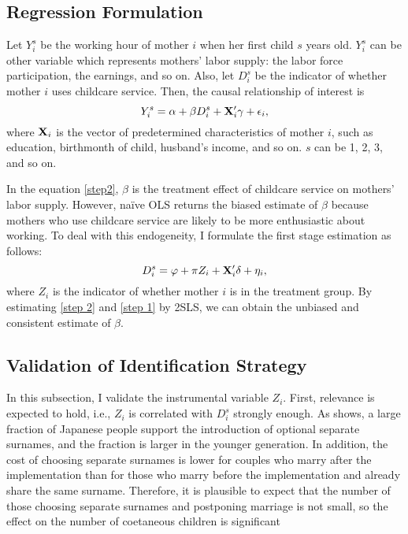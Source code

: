 \documentclass[12pt]{article}
\begin{document}
\subsection*{Regression Formulation}
Let $Y_i^s$ be the working hour of mother $i$ when her first child $s$ years old.
$Y_i^s$ can be other variable which represents mothers' labor supply: the labor force participation, the earnings, and so on.
Also, let $D_i^s$ be the indicator of whether mother $i$ uses childcare service. 
Then, the causal relationship of interest is 
\begin{equation}
  Y_i^s = \alpha + \beta D_i^s + \vb{X}_i'\vb{\gamma} + \epsilon_i, \label{step2}
\end{equation}
where $\vb{X}_i$ is the vector of predetermined characteristics of mother $i$, such as education, birthmonth of child, husband's income, and so on.
$s$ can be 1, 2, 3, and so on.


In the equation \eqref{step2}, $\beta$ is the treatment effect of childcare service on mothers' labor supply.
However, na\"ive OLS returns the biased estimate of $\beta$ because mothers who use childcare service are likely to be more enthusiastic about working.
To deal with this endogeneity, I formulate the first stage estimation as follows:
\begin{equation}
  D_i^s = \varphi + \pi Z_i + \vb{X}_i'\vb{\delta} + \eta_i, \label{step1}
\end{equation}
where $Z_i$ is the indicator of whether mother $i$ is in the treatment group.
By estimating \eqref{step 2} and \eqref{step 1} by 2SLS, we can obtain the unbiased and consistent estimate of $\beta$. 

\subsection*{Validation of Identification Strategy}
In this subsection, I validate the instrumental variable $Z_i$.
First, relevance is expected to hold, i.e., $Z_i$ is correlated with $D_i^s$ strongly enough. 
As \cite{nhk} shows, a large fraction of Japanese people support the introduction of optional separate surnames, and the fraction is larger in the younger generation.
In addition, the cost of choosing separate surnames is lower for couples who marry after the implementation than for those who marry before the implementation and already share the same surname.
Therefore, it is plausible to expect that the number of those choosing separate surnames and postponing marriage is not small, so the effect on the number of coetaneous children is significant
\end{document}
